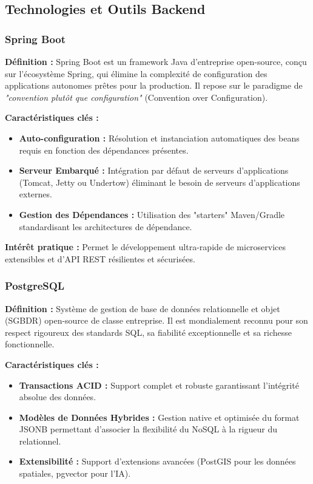\documentclass[a4paper,12pt]{article}
\begin{document}
\subsection{Technologies et Outils Backend}

\subsubsection{Spring Boot}
\textbf{Définition :} Spring Boot est un framework Java d'entreprise open-source, conçu sur l'écosystème Spring, qui élimine la complexité de configuration des applications autonomes prêtes pour la production. Il repose sur le paradigme de \textit{"convention plutôt que configuration"} (Convention over Configuration).

\textbf{Caractéristiques clés :}
\begin{itemize}[label=$\bullet$]
    \item \textbf{Auto-configuration :} Résolution et instanciation automatiques des beans requis en fonction des dépendances présentes.
    \item \textbf{Serveur Embarqué :} Intégration par défaut de serveurs d'applications (Tomcat, Jetty ou Undertow) éliminant le besoin de serveurs d'applications externes.
    \item \textbf{Gestion des Dépendances :} Utilisation des "starters" Maven/Gradle standardisant les architectures de dépendance.
\end{itemize}
\textbf{Intérêt pratique :} Permet le développement ultra-rapide de microservices extensibles et d'API REST résilientes et sécurisées.

\subsubsection{PostgreSQL}
\textbf{Définition :} Système de gestion de base de données relationnelle et objet (SGBDR) open-source de classe entreprise. Il est mondialement reconnu pour son respect rigoureux des standards SQL, sa fiabilité exceptionnelle et sa richesse fonctionnelle.

\textbf{Caractéristiques clés :}
\begin{itemize}[label=$\bullet$]
    \item \textbf{Transactions ACID :} Support complet et robuste garantissant l'intégrité absolue des données.
    \item \textbf{Modèles de Données Hybrides :} Gestion native et optimisée du format JSONB permettant d'associer la flexibilité du NoSQL à la rigueur du relationnel.
    \item \textbf{Extensibilité :} Support d'extensions avancées (PostGIS pour les données spatiales, pgvector pour l'IA).
\end{itemize}
\end{document}
